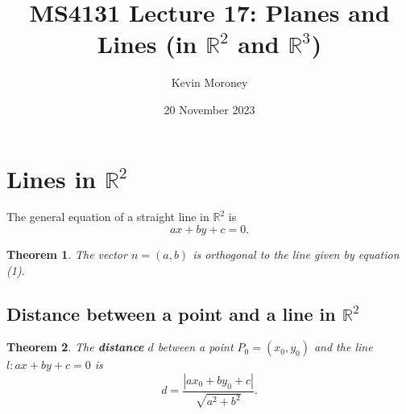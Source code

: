 \documentclass[a4paper, 12pt]{article}
\title{MS4131 Lecture 17: Planes and Lines (in $\mathbb{R}^2$ and $\mathbb{R}^3$)}
\author{Kevin Moroney}
\date{20 November 2023}
\newtheorem{theorem}{Theorem}[section]
\newcommand{\keyword}[1]{\textbf{#1}}
\begin{document}
    \maketitle
    \section{Lines in $\mathbb{R}^2$}
        The general equation of a straight line in $\mathbb{R}^2$ is
        \begin{equation}
            ax + by + c = 0.
        \end{equation}
        \begin{theorem}
            The vector $n = (a, b)$ is orthogonal to the line given by equation (1).
        \end{theorem}
        \subsection*{Distance between a point and a line in $\mathbb{R}^2$}
        \begin{theorem}
            The \keyword{distance} $d$ between a point $P_0 = (x_0, y_0)$ and the line
            $l: ax + by + c = 0$ is
            \[
                d = \frac{|ax_0 + by_0 + c|}{\sqrt{a^2 + b^2}}.
            \]
        \end{theorem}
\end{document}
